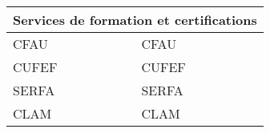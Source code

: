 
\begin{tabularx}{\linewidth}{lX}
	\toprule
	\multicolumn{2}{c}{Services de formation et certifications}\\
	\midrule
	\acrshort{CFAU} & \acrlong{CFAU}\\
	\acrshort{CUFEF} & \acrlong{CUFEF}\\
	\acrshort{SERFA} & \acrlong{SERFA}\\
	\acrshort{CLAM} & \acrlong{CLAM}\\
	\bottomrule
\end{tabularx}
